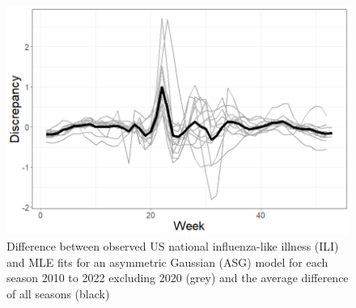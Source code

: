 \begin{figure}[hbt!]
    \centering
    \includegraphics[scale=.45]{Images/discrepancy.png}
    \caption{Difference between observed US national influenza-like illness 
    (ILI) and MLE fits for an asymmetric Gaussian (ASG) model for each season 
    2010 to 2022 excluding 2020 (grey) and the average difference of all 
    seasons (black)}
    \label{fig:discrepancy}
\end{figure}


